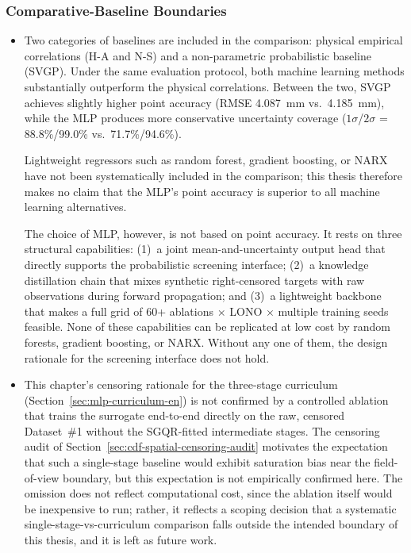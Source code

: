 \subsubsection*{Comparative-Baseline Boundaries}
\begin{itemize}
	\item Two categories of baselines are included in the comparison: physical empirical correlations (H-A and N-S) and a non-parametric probabilistic baseline (SVGP). Under the same evaluation protocol, both machine learning methods substantially outperform the physical correlations. Between the two, SVGP achieves slightly higher point accuracy (RMSE \SI{4.087}{mm} vs.\ \SI{4.185}{mm}), while the MLP produces more conservative uncertainty coverage ($1\sigma$/$2\sigma$ = 88.8\%/99.0\% vs.\ 71.7\%/94.6\%).

	      Lightweight regressors such as random forest, gradient boosting, or NARX have not been systematically included in the comparison; this thesis therefore makes no claim that the MLP's point accuracy is superior to all machine learning alternatives.

	      The choice of MLP, however, is not based on point accuracy. It rests on three structural capabilities: (1)~a joint mean-and-uncertainty output head that directly supports the probabilistic screening interface; (2)~a knowledge distillation chain that mixes synthetic right-censored targets with raw observations during forward propagation; and (3)~a lightweight backbone that makes a full grid of 60+ ablations $\times$ LONO $\times$ multiple training seeds feasible. None of these capabilities can be replicated at low cost by random forests, gradient boosting, or NARX. Without any one of them, the design rationale for the screening interface does not hold.

	\item This chapter's censoring rationale for the three-stage curriculum (Section~\ref{sec:mlp-curriculum-en}) is not confirmed by a controlled ablation that trains the surrogate end-to-end directly on the raw, censored Dataset~\#1 without the SGQR-fitted intermediate stages. The censoring audit of Section~\ref{sec:cdf-spatial-censoring-audit} motivates the expectation that such a single-stage baseline would exhibit saturation bias near the field-of-view boundary, but this expectation is not empirically confirmed here. The omission does not reflect computational cost, since the ablation itself would be inexpensive to run; rather, it reflects a scoping decision that a systematic single-stage-vs-curriculum comparison falls outside the intended boundary of this thesis, and it is left as future work.
\end{itemize}

